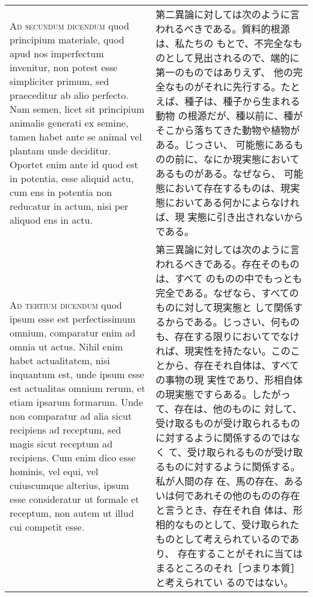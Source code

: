 \documentclass[10pt]{jsarticle}
\begin{document}
\begin{longtable}{p{21em}p{21em}}
\\

{\scshape Ad secundum dicendum} quod principium materiale, quod apud
nos imperfectum invenitur, non potest esse simpliciter primum, sed
praeceditur ab alio perfecto. Nam semen, licet sit principium animalis
generati ex semine, tamen habet ante se animal vel plantam unde
deciditur. Oportet enim ante id quod est in potentia, esse aliquid
actu, cum ens in potentia non reducatur in actum, nisi per aliquod ens
in actu.  


&

第二異論に対しては次のように言われるべきである。質料的根源は、私たちの
もとで、不完全なものとして見出されるので、端的に第一のものではありえず、
他の完全なものがそれに先行する。たとえば、種子は、種子から生まれる動物
の根源だが、種以前に、種がそこから落ちてきた動物や植物がある。じっさい、
可能態にあるものの前に、なにか現実態においてあるものがある。なぜなら、
可能態において存在するものは、現実態においてある何かによらなければ、現
実態に引き出されないからである。


\\

{\scshape Ad tertium dicendum} quod ipsum esse est perfectissimum
omnium, comparatur enim ad omnia ut actus. Nihil enim habet
actualitatem, nisi inquantum est, unde ipsum esse est actualitas
omnium rerum, et etiam ipsarum formarum. Unde non comparatur ad alia
sicut recipiens ad receptum, sed magis sicut receptum ad
recipiens. Cum enim dico esse hominis, vel equi, vel cuiuscumque
alterius, ipsum esse consideratur ut formale et receptum, non autem ut
illud cui competit esse.

&

第三異論に対しては次のように言われるべきである。存在そのものは、すべて
のものの中でもっとも完全である。なぜなら、すべてのものに対して現実態と
して関係するからである。じっさい、何ものも、存在する限りにおいてでなけ
れば、現実性を持たない。このことから、存在それ自体は、すべての事物の現
実性であり、形相自体の現実態ですらある。したがって、存在は、他のものに
対して、受け取るものが受け取られるものに対するように関係するのではなく
て、受け取られるものが受け取るものに対するように関係する。私が人間の存
在、馬の存在、あるいは何であれその他のものの存在と言うとき、存在それ自
体は、形相的なものとして、受け取られたものとして考えられているのであり、
存在することがそれに当てはまるところのそれ［つまり本質］と考えられてい
るのではない。

\end{longtable}
\end{document}
